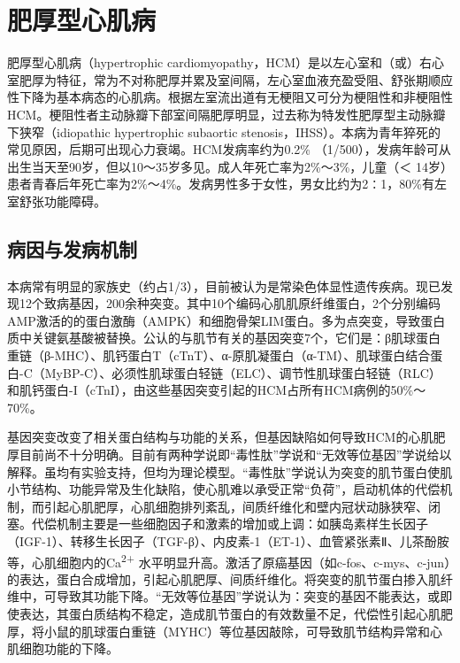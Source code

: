 \protect\hypertarget{text00307.html}{}{}

\section{肥厚型心肌病}

肥厚型心肌病（hypertrophic
cardiomyopathy，HCM）是以左心室和（或）右心室肥厚为特征，常为不对称肥厚并累及室间隔，左心室血液充盈受阻、舒张期顺应性下降为基本病态的心肌病。根据左室流出道有无梗阻又可分为梗阻性和非梗阻性HCM。梗阻性者主动脉瓣下部室间隔肥厚明显，过去称为特发性肥厚型主动脉瓣下狭窄（idiopathic
hypertrophic subaortic
stenosis，IHSS）。本病为青年猝死的常见原因，后期可出现心力衰竭。HCM发病率约为0.2\%
（1/500），发病年龄可从出生当天至90岁，但以10～35岁多见。成人年死亡率为2\%～3\%，儿童（＜
14岁）患者青春后年死亡率为2\%～4\%。发病男性多于女性，男女比约为2∶1，80\%有左室舒张功能障碍。

\subsection{病因与发病机制}

本病常有明显的家族史（约占1/3），目前被认为是常染色体显性遗传疾病。现已发现12个致病基因，200余种突变。其中10个编码心肌肌原纤维蛋白，2个分别编码AMP激活的的蛋白激酶（AMPK）和细胞骨架LIM蛋白。多为点突变，导致蛋白质中关键氨基酸被替换。公认的与肌节有关的基因突变7个，它们是：β肌球蛋白重链（β-MHC）、肌钙蛋白T（cTnT）、α-原肌凝蛋白（α-TM）、肌球蛋白结合蛋白-C（MyBP-C）、必须性肌球蛋白轻链（ELC）、调节性肌球蛋白轻链（RLC）和肌钙蛋白-I（cTnI），由这些基因突变引起的HCM占所有HCM病例的50\%～70\%。

基因突变改变了相关蛋白结构与功能的关系，但基因缺陷如何导致HCM的心肌肥厚目前尚不十分明确。目前有两种学说即“毒性肽”学说和“无效等位基因”学说给以解释。虽均有实验支持，但均为理论模型。“毒性肽”学说认为突变的肌节蛋白使肌小节结构、功能异常及生化缺陷，使心肌难以承受正常“负荷”，启动机体的代偿机制，而引起心肌肥厚，心肌细胞排列紊乱，间质纤维化和壁内冠状动脉狭窄、闭塞。代偿机制主要是一些细胞因子和激素的增加或上调：如胰岛素样生长因子（IGF-1）、转移生长因子（TGF-β）、内皮素-1（ET-1）、血管紧张素Ⅱ、儿茶酚胺等，心肌细胞内的Ca\textsuperscript{2+}
水平明显升高。激活了原癌基因（如c-fos、c-mys、c-jun）的表达，蛋白合成增加，引起心肌肥厚、间质纤维化。将突变的肌节蛋白掺入肌纤维中，可导致其功能下降。“无效等位基因”学说认为：突变的基因不能表达，或即使表达，其蛋白质结构不稳定，造成肌节蛋白的有效数量不足，代偿性引起心肌肥厚，将小鼠的肌球蛋白重链（MYHC）等位基因敲除，可导致肌节结构异常和心肌细胞功能的下降。

